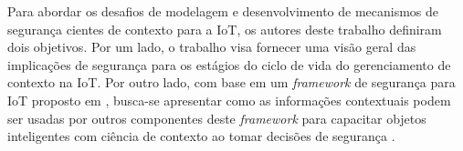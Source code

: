 \documentclass[tid,table]{texufpel} %
\begin{document}
Para abordar os desafios de modelagem e desenvolvimento de mecanismos de segurança cientes de contexto para a IoT, os autores deste trabalho definiram dois objetivos. Por um lado, o trabalho visa fornecer uma visão geral das implicações de segurança para os estágios do ciclo de vida do gerenciamento de contexto na IoT. Por outro lado, com base em um \textit{framework} de segurança para IoT proposto em \cite{bernabe14}, busca-se apresentar como as informações contextuais podem ser usadas por outros componentes deste \textit{framework} para capacitar objetos inteligentes com ciência de contexto ao tomar decisões de segurança \cite{ramos15}.

\end{document}
